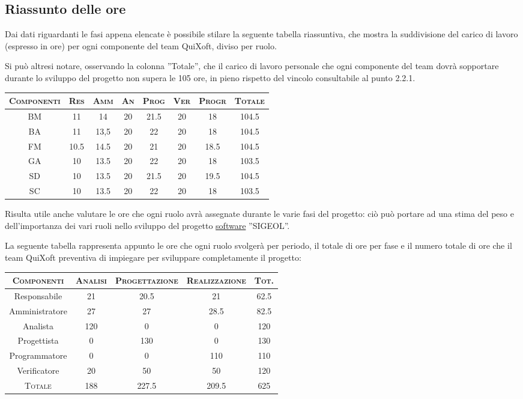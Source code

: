 \documentclass[11pt,a4paper]{article}
\begin{document}
\subsection{Riassunto delle ore}
Dai dati riguardanti le fasi appena elencate è possibile stilare la seguente tabella riassuntiva, che mostra la suddivisione del carico di lavoro (espresso in ore) per ogni componente del team QuiXoft, diviso per ruolo.

Si può altresi notare, osservando la colonna ''Totale'', che il carico di lavoro personale che ogni componente del team dovrà sopportare durante lo sviluppo del progetto non supera le 105 ore, in pieno rispetto del vincolo consultabile al punto 2.2.1.
\\ \bigskip
\begin{center}
\begin{tabular}{|c||c|c|c|c|c|c||c|}
\hline
\textsc{Componenti} & \textsc{Res} & \textsc{Amm} & \textsc{An} & \textsc{Prog} & \textsc{Ver} & \textsc{Progr} & \textsc{Totale}\\
\hline \hline
BM & 11 & 14 & 20 & 21.5 & 20 & 18 & 104.5 \\ \hline
BA & 11 & 13,5 & 20 & 22 & 20 & 18 & 104.5 \\ \hline
FM & 10.5 & 14.5 & 20 & 21 & 20 & 18.5 & 104.5 \\ \hline
GA & 10 & 13.5 & 20 & 22 & 20 & 18 & 103.5 \\ \hline
SD & 10 & 13.5 & 20 & 21.5 & 20 & 19.5 & 104.5\\ \hline
SC & 10 & 13.5 & 20 & 22 & 20 & 18 & 103.5\\ \hline
\end{tabular}
\end{center}
\bigskip \bigskip \bigskip

Risulta utile anche valutare le ore che ogni ruolo avrà assegnate durante le varie fasi del progetto: ciò può portare ad una stima del peso e dell'importanza dei vari ruoli nello sviluppo del progetto \underline{software} ''SIGEOL''.

La seguente tabella rappresenta appunto le ore che ogni ruolo svolgerà per periodo, il totale di ore per fase e il numero totale di ore che il team QuiXoft preventiva di impiegare per sviluppare completamente il progetto:
\begin{center}
\begin{tabular}{|c||c|c|c||c|}
\hline
\textsc{Componenti}& \textsc{Analisi} & \textsc{Progettazione} & \textsc{Realizzazione} & \textsc{Tot.} \\ \hline \hline
Responsabile & 21 & 20.5 & 21 & 62.5 \\ \hline
Amministratore & 27 & 27 & 28.5 & 82.5 \\ \hline
Analista & 120 & 0 & 0 & 120 \\ \hline
Progettista & 0 & 130 & 0 & 130 \\ \hline
Programmatore & 0 & 0 & 110 & 110 \\ \hline
Verificatore & 20 & 50 & 50 & 120 \\ \hline \hline
\textsc{Totale} & 188 & 227.5 & 209.5 & 625 \\ \hline
\end{tabular}
\end{center}
\bigskip
\end{document}
